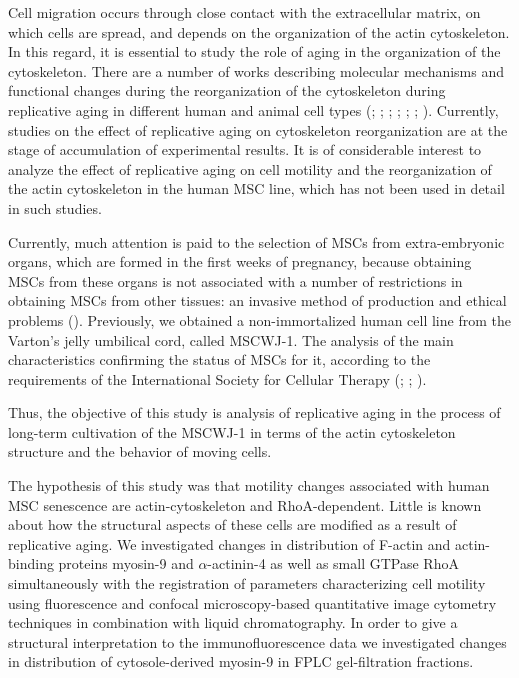 \documentclass[english,authoryear]{elsarticle}
\begin{document}
Cell migration occurs through close contact with the extracellular matrix, on which cells are spread, and depends on the organization of the actin cytoskeleton. In this regard, it is essential to study the role of aging in the organization of the cytoskeleton. There are a number of works describing molecular mechanisms and functional changes during the reorganization of the cytoskeleton during replicative aging in different human and animal cell types (\cite{larsen2003phosphatases}; \cite{le2008regulation}; \cite{wang2009protein}; \cite{geissler2012functional}; \cite{ozcan2016unbiased}; \cite{turinetto2016senescence}; \cite{moujaber2019cellular}). Currently, studies on the effect of replicative aging on cytoskeleton reorganization are at the stage of accumulation of experimental results. It is of considerable interest to analyze the effect of replicative aging on cell motility and the reorganization of the actin cytoskeleton in the human MSC line, which has not been used in detail in such studies.


Currently, much attention is paid to the selection of MSCs from extra-embryonic organs, which are formed in the first weeks of pregnancy, because obtaining MSCs from these organs is not associated with a number of restrictions in obtaining MSCs from other tissues: an invasive method of production and ethical problems (\cite{bongso2013therapeutic}). Previously, we obtained a non-immortalized human cell line from the Varton's jelly umbilical cord, called MSCWJ-1. The analysis of the main characteristics confirming the status of MSCs for it, according to the requirements of the International Society for Cellular Therapy (\cite{dominici2006minimal}; \cite{sensebe2010mesenchymal}; \cite{krylova2017derivation}).


Thus, the objective of this study is analysis of replicative aging in the process of long-term cultivation of the MSCWJ-1 in terms of the actin cytoskeleton structure and the behavior of moving cells.


The hypothesis of this study was that motility changes associated with human MSC senescence are actin-cytoskeleton and RhoA-dependent.
Little is known about how the structural aspects of these cells are modified as a result of replicative aging.
We investigated changes in distribution of F-actin and actin-binding proteins myosin-9 and $\alpha$-actinin-4 as well as small GTPase RhoA simultaneously with the registration of parameters characterizing cell motility using fluorescence and confocal microscopy-based quantitative image cytometry techniques in combination with liquid chromatography.
In order to give a structural interpretation to the immunofluorescence data we investigated changes in distribution of cytosole-derived myosin-9 in FPLC gel-filtration fractions.
\end{document}
